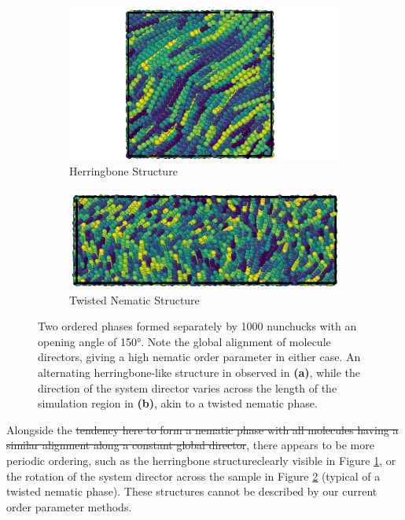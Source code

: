 \documentclass[11pt, a4paper]{article} %
\providecommand{\DIFadd}[1]{{\protect\color{blue}\uwave{#1}}} %
\providecommand{\DIFdel}[1]{{\protect\color{red}\sout{#1}}}                      %
\providecommand{\DIFaddbegin}{} %
\providecommand{\DIFaddend}{} %
\providecommand{\DIFdelbegin}{} %
\providecommand{\DIFdelend}{} %
\begin{document}
\begin{figure}
	\vspace{0.5cm}
	\centering
	\begin{subfigure}{.4\textwidth}
		\centering
		\includegraphics[width=.9\linewidth]{Figures/nun_fa_herringbone}
		\caption{Herringbone Structure}
		\label{fig:nun_fa_herringbone}
	\end{subfigure}%
	\begin{subfigure}{.6\textwidth}
		\centering
		\includegraphics[width=.9\linewidth]{Figures/nun_fa_twist}
		\caption{Twisted Nematic Structure}
		\label{fig:nun_fa_twist}
	\end{subfigure}
	\caption{Two ordered phases formed separately by \num{1000} nunchucks with an opening angle of \ang{150}. Note the global alignment of molecule directors, giving a high nematic order parameter in either case. An alternating herringbone-like structure in observed in \textbf{(a)}, while the direction of the system director varies across the length of the simulation region in \textbf{(b)}, akin to a twisted nematic phase.}
	\label{fig:nun_fa_views}
\end{figure}

Alongside the \DIFdelbegin \DIFdel{tendency here to form a nematic phase with all molecules having a similar alignment along a constant global director}\DIFdelend \DIFaddbegin \DIFadd{\textcolor{forestgreen}{tendency here to form a nematic phase with all molecules having a similar alignment along a constant global director}}\DIFaddend , there appears to be more periodic ordering, such as the herringbone structure\DIFaddbegin \DIFadd{, \textcolor{forestgreen}{which is} }\DIFaddend clearly visible in Figure \ref{fig:nun_fa_herringbone}, or the rotation of the system director across the sample in Figure \ref{fig:nun_fa_twist} (typical of a twisted nematic phase). These structures cannot be described by our current order parameter methods.
\end{document}
